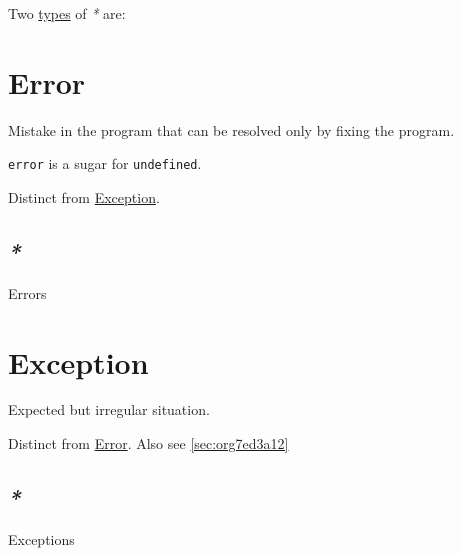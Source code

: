 \documentclass[a4paper,14pt,oneside]{book}
\begin{document}
Two \hyperref[org4dcd7d5]{types} of \emph{*} are:

\chapter{\label{orgbb60dc6}Error}
\label{sec:org80309e6}
Mistake in the program that can be resolved only by fixing the program.

\texttt{error} is a sugar for \texttt{undefined}.

Distinct from \hyperref[orgabfe820]{Exception}.

\section{\emph{*}}
\label{sec:org4f8759e}

\label{org72f6726}Errors

\chapter{\label{orgabfe820}Exception}
\label{sec:org62358a9}
Expected but irregular situation.

Distinct from \hyperref[orgbb60dc6]{Error}. Also see \ref{sec:org7ed3a12}

\section{\emph{*}}
\label{sec:org083b2d4}

\label{org89b93e6}Exceptions
\end{document}

